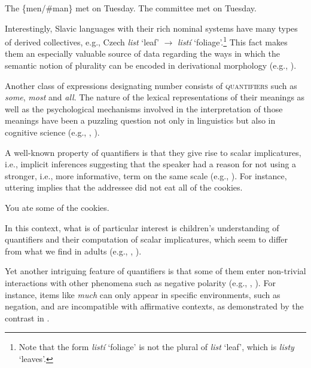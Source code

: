 \documentclass[output=paper]{langscibook}
\begin{document}
\ea\label{doc-wag:ex:collectives}
\ea The \{men/\#man\} met on Tuesday.
\ex The committee met on Tuesday. \hfill \citep[80, adapted]{barker1992group}
\z
\z

\noindent Interestingly, Slavic languages with their rich nominal systems have many types of derived collectives, e.g., Czech \textit{list} `leaf' $\rightarrow$ \textit{listí} `foliage'.\footnote{Note that the form \textit{listí} `foliage' is not the plural of \textit{list} `leaf', which is \textit{listy} `leaves'.} This fact makes them an especially valuable source of data regarding the ways in which the semantic notion of plurality can be encoded in derivational morphology (e.g., ).

Another class of expressions designating number consists of \textsc{quantifiers} such as \textit{some}, \textit{most} and \textit{all}. The nature of the lexical representations of their meanings as well as the psychological mechanisms involved in the interpretation of those meanings have been a puzzling question not only in linguistics but also in cognitive science (e.g., \citealt{pietroski2009meaning, lidz_et-al2011interface}, ).

A well-known property of quantifiers is that they give rise to scalar implicatures, i.e., implicit inferences suggesting that the speaker had a reason for not using a stronger, i.e., more informative, term on the same scale (e.g., \citealt{horn1984toward}). For instance, uttering  implies that the addressee did not eat all of the cookies.

\ea You ate some of the cookies. \hfill \citep[14]{horn1984toward}\label{doc-wag:ex:scalar-implicature}
\z

\noindent In this context, what is of particular interest is children's understanding of quantifiers and their computation of scalar implicatures, which seem to differ from what we find in adults (e.g., \citealt{noveck2001children, papafragou2004children}, ).

Yet another intriguing feature of quantifiers is that some of them enter non-trivial interactions with other phenomena such as negative polarity (e.g., \citealt{isreal1996polarity, solt2015q-adjectives}, ). For instance, items like \textit{much} can only appear in specific environments, such as negation, and are incompatible with affirmative contexts, as demonstrated by the contrast in .
\end{document}
